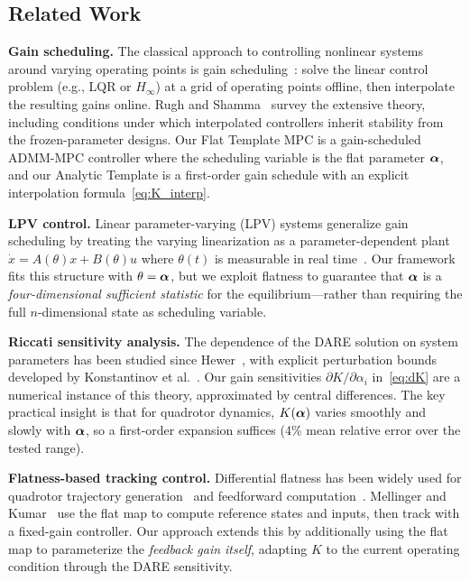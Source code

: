 \subsection{Related Work}\label{sec:related}

\textbf{Gain scheduling.}
The classical approach to controlling nonlinear systems around
varying operating points is gain scheduling~\cite{rugh2000}:
solve the linear control problem (e.g., LQR or $H_\infty$) at
a grid of operating points offline, then interpolate the resulting
gains online.
Rugh and Shamma~\cite{rugh2000} survey the extensive theory,
including conditions under which interpolated controllers
inherit stability from the frozen-parameter designs.
Our Flat Template MPC is a gain-scheduled ADMM-MPC controller
where the scheduling variable is the flat parameter $\bm{\alpha}$,
and our Analytic Template is a first-order gain schedule with
an explicit interpolation formula~\eqref{eq:K_interp}.

\textbf{LPV control.}
Linear parameter-varying (LPV) systems generalize gain scheduling
by treating the varying linearization as a parameter-dependent
plant $\dot{x} = A(\theta) x + B(\theta) u$ where $\theta(t)$
is measurable in real time~\cite{shamma1991}.
Our framework fits this structure with $\theta = \bm{\alpha}$,
but we exploit flatness to guarantee that $\bm{\alpha}$ is a
\emph{four-dimensional sufficient statistic} for the
equilibrium---rather than requiring the full $n$-dimensional
state as scheduling variable.

\textbf{Riccati sensitivity analysis.}
The dependence of the DARE solution on system parameters has been
studied since Hewer~\cite{hewer1971}, with explicit perturbation
bounds developed by Konstantinov et al.~\cite{konstantinov1993}.
Our gain sensitivities $\partial K / \partial \alpha_i$
in~\eqref{eq:dK} are a numerical instance of this theory,
approximated by central differences.
The key practical insight is that for quadrotor dynamics,
$K(\bm{\alpha})$ varies smoothly and slowly with $\bm{\alpha}$,
so a first-order expansion suffices (4\% mean relative error
over the tested range).

\textbf{Flatness-based tracking control.}
Differential flatness has been widely used for quadrotor
trajectory generation~\cite{mellinger2011,mueller2015} and
feedforward computation~\cite{faessler2018}.
Mellinger and Kumar~\cite{mellinger2011} use the flat map to
compute reference states and inputs, then track with a fixed-gain
controller.
Our approach extends this by additionally using the flat map
to parameterize the \emph{feedback gain itself},
adapting $K$ to the current operating condition through
the DARE sensitivity.

